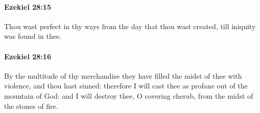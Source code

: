 		\paragraph{Ezekiel 28:15} %
			\label{EZEKIEL-28-15}

			Thou wast perfect in thy ways from the day that thou wast created, till iniquity was found in thee.


		\paragraph{Ezekiel 28:16} %
			\label{EZEKIEL-28-16}

			By the multitude of thy merchandise they have filled the midst of thee with violence, and thou hast sinned: therefore I will cast thee as profane out of the mountain of God: and I will destroy thee, O covering cherub, from the midst of the stones of fire.


